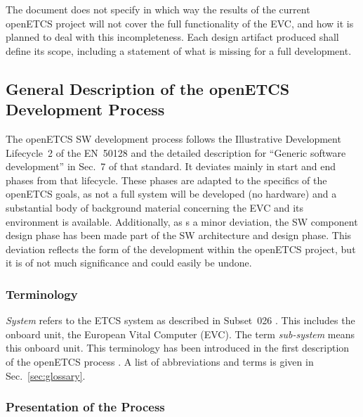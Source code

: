 \documentclass{template/openetcs_article}
\begin{document}
The document does not specify in which way the results of the current
openETCS project will not cover the full functionality of the EVC, and
how it is planned to deal with this incompleteness. Each design
artifact produced shall define its scope, including a statement of
what is missing for a full development.

\subsection{General Description of the openETCS Development Process}
\label{sec:general-description}

The openETCS SW development process follows the Illustrative
Development Lifecycle~2 \cite[Fig.~4]{EN50128:2011} of the EN~50128
and the detailed description for ``Generic software development'' in
Sec.~7 of that standard. It deviates mainly in start and end phases
from that lifecycle. These phases are adapted to the specifics of the
openETCS goals, as not a full system will be developed (no hardware)
and a substantial body of background material concerning the EVC and
its environment is available. Additionally, as s a minor deviation,
the SW component design phase has been made part of the SW
architecture and design phase. This deviation reflects the form of the
development within the openETCS project, but it is of not much
significance and could easily be undone.

\subsubsection{Terminology}

\emph{System} refers to the ETCS system as described in Subset~026
\cite{subset-026:3.3.0}. This includes the onboard unit, the European
Vital Computer (EVC). The term \emph{sub-system} means this onboard
unit. This terminology has been introduced in the first description of
the openETCS process \cite{openETCS:D2.3}. A list of abbreviations and
terms is given in Sec.~\ref{sec:glossary}.

\subsubsection{Presentation of the Process}
\label{sec:presentation-process}
\end{document}
